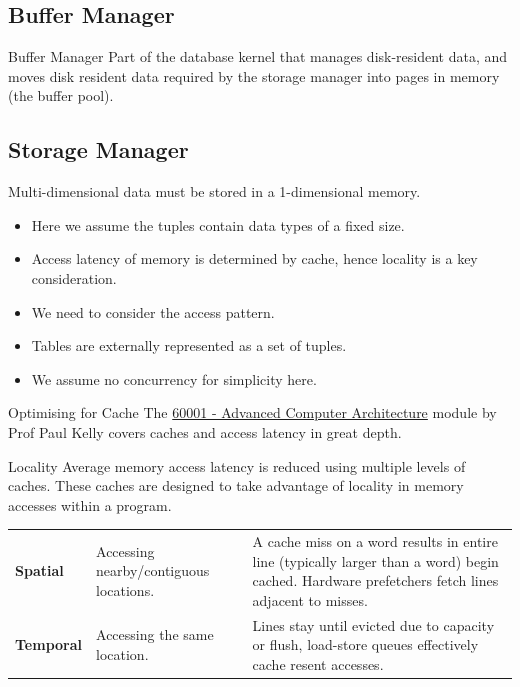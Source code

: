 \subsection{Buffer Manager}
\begin{definitionbox}{Buffer Manager}
    Part of the database kernel that manages disk-resident data, and moves disk resident data required by the storage manager into pages in memory (the buffer pool).
\end{definitionbox}


\subsection{Storage Manager}
Multi-dimensional data must be stored in a 1-dimensional memory.
\begin{itemize}
    \item Here we assume the tuples contain data types of a fixed size.
    \item Access latency of memory is determined by cache, hence locality is a key consideration.
    \item We need to consider the access pattern.
    \item Tables are externally represented as a set of tuples.
    \item We assume no concurrency for simplicity here.
\end{itemize}

\begin{sidenotebox}{Optimising for Cache}
    The \href{\ACAURL}{60001 - Advanced Computer Architecture} module by Prof Paul Kelly covers caches and access latency in great depth.
\end{sidenotebox}
\begin{definitionbox}{Locality}
    Average memory access latency is reduced using multiple levels of caches. These caches are designed to take advantage of locality in memory accesses within a program.
    \begin{center}
        \begin{tabular}{l p{} p{}}
            \textbf{Spatial}  & Accessing nearby/contiguous locations. & A cache miss on a word results in entire line (typically larger than a word) begin cached. Hardware prefetchers fetch lines adjacent to misses. \\
            \textbf{Temporal} & Accessing the same location.           & Lines stay until evicted due to capacity or flush, load-store queues effectively cache resent accesses.                                         \\
        \end{tabular}
    \end{center}
\end{definitionbox}


